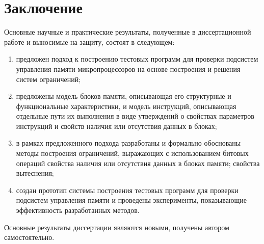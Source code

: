 \chapter*{Заключение}

Основные научные и практические результаты, полученные в
диссертационной работе и выносимые на защиту, состоят в следующем:

\begin{enumerate}
    \item предложен подход к построению тестовых программ для проверки подсистем управления памяти микропроцессоров на основе построения и решения систем ограничений;

    \item предложены модель блоков памяти, описывающая его структурные и функциональные характеристики, и модель инструкций, описывающая отдельные пути их выполнения в виде утверждений о свойствах параметров инструкций и свойств наличия или отсутствия данных в блоках;

    \item в рамках предложенного подхода разработаны и формально обоснованы методы построения ограничений, выражающих с использованием битовых операций свойства наличия или отсутствия данных в блоках памяти; свойства вытеснения;

    \item создан прототип системы построения тестовых программ для проверки подсистем управления памяти и проведены эксперименты, показывающие эффективность разработанных методов.
\end{enumerate}

Основные результаты диссертации являются новыми, получены автором самостоятельно.

